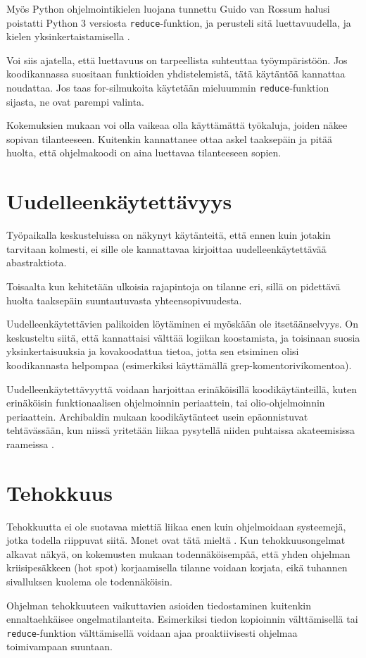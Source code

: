 Myös Python ohjelmointikielen luojana tunnettu Guido van Rossum halusi poistatti Python 3 versiosta \texttt{reduce}-funktion, ja perusteli sitä luettavuudella, ja kielen yksinkertaistamisella \cite{vanrossum2008reduce}.

Voi siis ajatella, että luettavuus on tarpeellista suhteuttaa työympäristöön. Jos koodikannassa suositaan funktioiden yhdistelemistä, tätä käytäntöä kannattaa noudattaa. Jos taas for-silmukoita käytetään mieluummin \texttt{reduce}-funktion sijasta, ne ovat parempi valinta.

Kokemuksien mukaan voi olla vaikeaa olla käyttämättä työkaluja, joiden näkee sopivan tilanteeseen. Kuitenkin kannattanee ottaa askel taaksepäin ja pitää huolta, että ohjelmakoodi on aina luettavaa tilanteeseen sopien.

\section{Uudelleenkäytettävyys}

Työpaikalla keskusteluissa on näkynyt käytänteitä, että ennen kuin jotakin tarvitaan kolmesti, ei sille ole kannattavaa kirjoittaa uudelleenkäytettävää abastraktiota.

Toisaalta kun kehitetään ulkoisia rajapintoja on tilanne eri, sillä on pidettävä huolta taaksepäin suuntautuvasta yhteensopivuudesta.

Uudelleenkäytettävien palikoiden löytäminen ei myöskään ole itsetäänselvyys. On keskusteltu siitä, että kannattaisi välttää logiikan koostamista, ja toisinaan suosia yksinkertaisuuksia ja kovakoodattua tietoa, jotta sen etsiminen olisi koodikannasta helpompaa (esimerkiksi käyttämällä grep-komentorivikomentoa).

Uudelleenkäytettävyyttä voidaan harjoittaa erinäköisillä koodikäytänteillä, kuten erinäköisin funktionaalisen ohjelmoinnin periaattein, tai olio-ohjelmoinnin periaattein. Archibaldin mukaan koodikäytänteet usein epäonnistuvat tehtävässään, kun niissä yritetään liikaa pysytellä niiden puhtaissa akateemisissa raameissa \cite{pennane_fp_gist}.



\section{Tehokkuus}
Tehokkuutta ei ole suotavaa miettiä liikaa enen kuin ohjelmoidaan systeemejä, jotka todella riippuvat siitä. Monet ovat tätä mieltä \cite{pennane_fp_gist,prematureoptimization}. Kun tehokkuusongelmat alkavat näkyä, on kokemusten mukaan todennäköisempää, että yhden ohjelman kriisipesäkkeen (hot spot) korjaamisella tilanne voidaan korjata, eikä tuhannen sivalluksen kuolema ole todennäköisin.

Ohjelman tehokkuuteen vaikuttavien asioiden tiedostaminen kuitenkin ennaltaehkäisee ongelmatilanteita. Esimerkiksi tiedon kopioinnin välttämisellä tai \texttt{reduce}-funktion välttämisellä voidaan ajaa proaktiivisesti ohjelmaa toimivampaan suuntaan.

